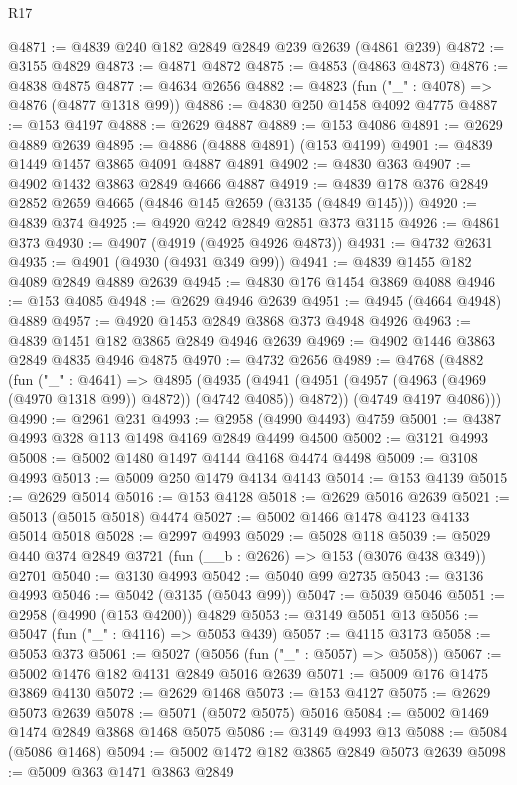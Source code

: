 \begin{lexlean}{R17}
\begin{coremodule}
@4871 := @4839 @240 @182 @2849 @2849 @239 @2639 (@4861 @239)
@4872 := @3155 @4829
@4873 := @4871 @4872
@4875 := @4853 (@4863 @4873)
@4876 := @4838 @4875
@4877 := @4634 @2656
@4882 := @4823 (fun ("_" : @4078) => @4876 (@4877 @1318 @99))
@4886 := @4830 @250 @1458 @4092 @4775
@4887 := @153 @4197
@4888 := @2629 @4887
@4889 := @153 @4086
@4891 := @2629 @4889 @2639
@4895 := @4886 (@4888 @4891) (@153 @4199)
@4901 := @4839 @1449 @1457 @3865 @4091 @4887 @4891
@4902 := @4830 @363
@4907 := @4902 @1432 @3863 @2849 @4666 @4887
@4919 := @4839 @178 @376 @2849 @2852 @2659 @4665 (@4846 @145 @2659 (@3135 (@4849 @145)))
@4920 := @4839 @374
@4925 := @4920 @242 @2849 @2851 @373 @3115
@4926 := @4861 @373
@4930 := @4907 (@4919 (@4925 @4926 @4873))
@4931 := @4732 @2631
@4935 := @4901 (@4930 (@4931 @349 @99))
@4941 := @4839 @1455 @182 @4089 @2849 @4889 @2639
@4945 := @4830 @176 @1454 @3869 @4088
@4946 := @153 @4085
@4948 := @2629 @4946 @2639
@4951 := @4945 (@4664 @4948) @4889
@4957 := @4920 @1453 @2849 @3868 @373 @4948 @4926
@4963 := @4839 @1451 @182 @3865 @2849 @4946 @2639
@4969 := @4902 @1446 @3863 @2849 @4835 @4946 @4875
@4970 := @4732 @2656
@4989 := @4768
    (@4882
      (fun ("_" : @4641) =>
      @4895
        (@4935 (@4941 (@4951 (@4957 (@4963 (@4969 (@4970 @1318 @99)) @4872)) (@4742 @4085)) @4872))
        (@4749 @4197 @4086)))
@4990 := @2961 @231
@4993 := @2958 (@4990 @4493) @4759
@5001 := @4387 @4993 @328 @113 @1498 @4169 @2849 @4499 @4500
@5002 := @3121 @4993
@5008 := @5002 @1480 @1497 @4144 @4168 @4474 @4498
@5009 := @3108 @4993
@5013 := @5009 @250 @1479 @4134 @4143
@5014 := @153 @4139
@5015 := @2629 @5014
@5016 := @153 @4128
@5018 := @2629 @5016 @2639
@5021 := @5013 (@5015 @5018) @4474
@5027 := @5002 @1466 @1478 @4123 @4133 @5014 @5018
@5028 := @2997 @4993
@5029 := @5028 @118
@5039 := @5029 @440 @374 @2849 @3721 (fun (__b : @2626) => @153 (@3076 @438 @349)) @2701
@5040 := @3130 @4993
@5042 := @5040 @99 @2735
@5043 := @3136 @4993
@5046 := @5042 (@3135 (@5043 @99))
@5047 := @5039 @5046
@5051 := @2958 (@4990 (@153 @4200)) @4829
@5053 := @3149 @5051 @13
@5056 := @5047 (fun ("_" : @4116) => @5053 @439)
@5057 := @4115 @3173
@5058 := @5053 @373
@5061 := @5027 (@5056 (fun ("_" : @5057) => @5058))
@5067 := @5002 @1476 @182 @4131 @2849 @5016 @2639
@5071 := @5009 @176 @1475 @3869 @4130
@5072 := @2629 @1468
@5073 := @153 @4127
@5075 := @2629 @5073 @2639
@5078 := @5071 (@5072 @5075) @5016
@5084 := @5002 @1469 @1474 @2849 @3868 @1468 @5075
@5086 := @3149 @4993 @13
@5088 := @5084 (@5086 @1468)
@5094 := @5002 @1472 @182 @3865 @2849 @5073 @2639
@5098 := @5009 @363 @1471 @3863 @2849

\end{coremodule}
\end{lexlean}
